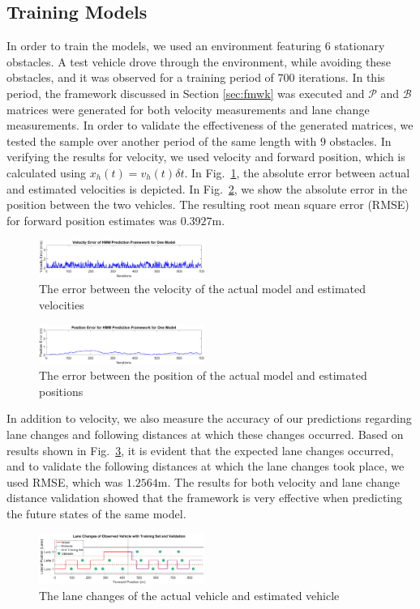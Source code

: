 \documentclass[letterpaper, 10 pt, conference]{ieeeconf}  %
\begin{document}
\subsection{Training Models}
In order to train the models, we used an environment featuring $6$ stationary obstacles. A test vehicle drove through the environment, while avoiding these obstacles, and it was observed for a training period of 700 iterations. In this period, the framework discussed in Section \ref{sec:fmwk} was executed and $\mathcal P$ and $\mathcal B$ matrices were generated for both velocity measurements and lane change measurements. In order to validate the effectiveness of the generated matrices, we tested the sample over another period of the same length with $9$ obstacles. In verifying the results for velocity, we used velocity and forward position, which is calculated using $x_h(t) = v_h(t)\delta t$. In Fig.~\ref{fig:trainvel}, the absolute error between actual and estimated velocities is depicted. In Fig.~\ref{fig:trainpos}, we show the absolute error in the position between the two vehicles. The resulting root mean square error (RMSE) for forward position estimates was $0.3927$m.
\begin{figure}[ht]
\includegraphics[width=0.48\textwidth]{fig/trainvelerror.png}
\caption{The error between the velocity of the actual model and estimated velocities} \label{fig:trainvel}
\end{figure}
\begin{figure}[ht]
\includegraphics[width=0.48\textwidth]{fig/trainposerror.png}
\caption{The error between the position of the actual model and estimated positions} \label{fig:trainpos}
\end{figure}

In addition to velocity, we also measure the accuracy of our predictions regarding lane changes and following distances at which these changes occurred. Based on results shown in Fig.~\ref{fig:train2}, it is evident that the expected lane changes occurred, and to validate the following distances at which the lane changes took place, we used RMSE, which was $1.2564$m. The results for both velocity and lane change distance validation showed that the framework is very effective when predicting the future states of the same model.
\begin{figure}[ht]
\includegraphics[width=0.48\textwidth]{fig/train2.png}
\caption{The lane changes of the actual vehicle and estimated vehicle} \label{fig:train2}
\end{figure}
\end{document}
